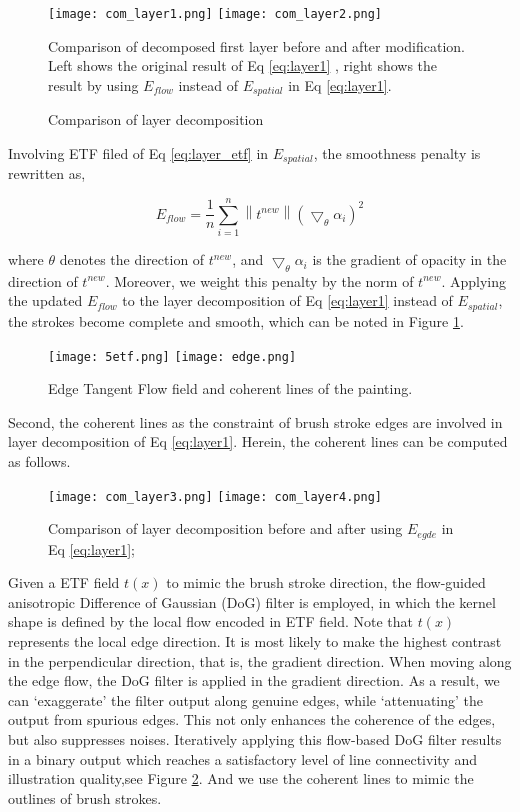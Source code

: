 \begin{figure}[H]
	\centering
	\texttt{[image: com\_layer1.png]}
	\texttt{[image: com\_layer2.png]}
	\caption{Comparison of layer decomposition  }
	\label{com eflow}
	\medskip
	\small
	Comparison of decomposed first layer before and after modification. Left shows the original result of Eq \ref{eq:layer1} , right shows the result by using $E_{flow}$ instead of $E_{spatial}$ in Eq \ref{eq:layer1}.
\end{figure}

Involving ETF filed of Eq \ref{eq:layer_etf} in $E_{spatial}$, the smoothness penalty is rewritten as,

\begin{equation} 
E_{flow}=\frac{1}{n} \sum_{i=1}^{n} \left \| t^{new} \right \| \left ( \bigtriangledown_{\theta}\alpha_{i} \right )^2 
\end{equation} 

where $\theta$ denotes the direction of $t^{new}$, and $ \bigtriangledown_{\theta}\alpha_{i} $ is the gradient of opacity in the direction of $t^{new}$. Moreover, we weight this penalty by the norm of $t^{new}$. Applying the updated $E_{flow}$ to the layer decomposition of Eq \ref{eq:layer1} instead of $E_{spatial}$, the strokes become complete and smooth, which can be noted in Figure \ref{com eflow}.

\begin{figure}[H]\label{etfline}
	\centering
	\texttt{[image: 5etf.png]}
	\texttt{[image: edge.png]}
	\caption{Edge Tangent Flow field and coherent lines of the painting.}
\end{figure}


Second, the coherent lines as the constraint of brush stroke edges are involved in layer decomposition of Eq \ref{eq:layer1}. Herein, the coherent lines can be computed as follows.
\begin{figure}[H]
	\centering
	\texttt{[image: com\_layer3.png]}
	\texttt{[image: com\_layer4.png]}
	\caption{Comparison of layer decomposition before and after using $E_{egde}$  in Eq \ref{eq:layer1}; }
	\label{com:edge}
\end{figure}
Given a ETF field $t(x)$ to mimic the brush stroke direction, the flow-guided anisotropic Difference of Gaussian (DoG) filter is employed, in which the kernel shape is defined by the local flow encoded in ETF field. Note that $t(x)$ represents the local edge direction. It is most likely to make the highest contrast in the perpendicular direction, that is, the gradient direction. When moving along the edge flow, the DoG filter is applied in the gradient direction. As a result, we can ‘exaggerate’ the filter output along genuine edges, while ‘attenuating’ the output from spurious edges. This not only enhances the coherence of the edges, but also suppresses noises. Iteratively applying this flow-based DoG filter results in a binary output which reaches a satisfactory level of line connectivity and illustration quality,see Figure \ref{etfline}. And we use the coherent lines to mimic the outlines of brush strokes.

